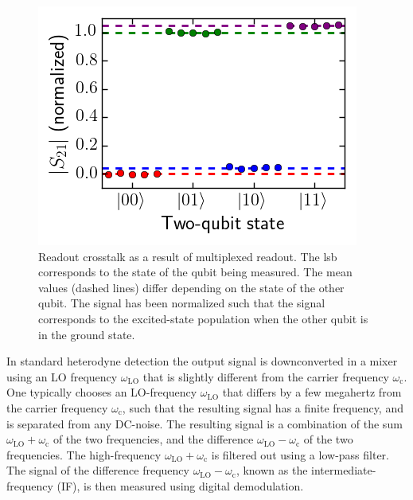           \begin{figure}
            \begin{center}
            \vspace{-30pt}
              \includegraphics[width=\textwidth]{Figures/Calibration routines/crosstalk.png}
            \end{center}
            \vspace{-20 pt}
            \caption{Readout crosstalk as a result of multiplexed readout. The lsb corresponds to the state of the qubit being measured. The mean values (dashed lines) differ depending on the state of the other qubit. The signal has been normalized such that the signal corresponds to the excited-state population when the other qubit is in the ground state.}
            \label{fig:crosstalk}
          \end{figure}
          In standard heterodyne detection the output signal is downconverted in a mixer using an LO frequency $\omega_\text{LO}$ that is slightly different from the carrier frequency $\omega_\text{c}$. One typically chooses an LO-frequency $\omega_\text{LO}$ that differs by a few megahertz from the carrier frequency $\omega_\text{c}$, such that the resulting signal has a finite frequency, and is separated from any DC-noise. The resulting signal is a combination of the sum $\omega_\text{LO} + \omega_\text{c}$ of the two frequencies, and the difference $\omega_\text{LO} - \omega_\text{c}$ of the two frequencies. The high-frequency $\omega_\text{LO} + \omega_\text{c}$ is filtered out using a low-pass filter. The signal of the difference frequency $\omega_\text{LO} - \omega_\text{c}$, known as the intermediate-frequency (IF), is then measured using digital demodulation.


